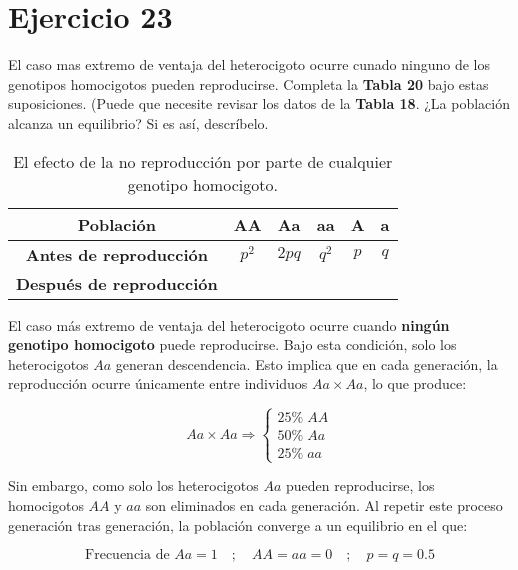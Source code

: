 \documentclass{article}
\begin{document}
\section*{Ejercicio 23}
El caso mas extremo de ventaja del heterocigoto ocurre cunado ninguno de los genotipos homocigotos pueden reproducirse. Completa la \textbf{Tabla 20} bajo estas suposiciones. (Puede que necesite revisar los datos de la \textbf{Tabla 18}. ¿La población alcanza un equilibrio? Si es así, descríbelo. 

\begin{table}[h!]
\centering
\caption{El efecto de la no reproducción por parte de cualquier genotipo homocigoto.}
\begin{tabular}{|c|c|c|c|c|c|}
\hline
\textbf{Población} & \textbf{AA} & \textbf{Aa} & \textbf{aa} & \textbf{A} & \textbf{a} \\
\hline
\textbf{Antes de reproducción} & \( p^2 \) & \( 2pq \) & \( q^2 \) & \( p \) & \( q \) \\
\textbf{Después de reproducción} &  &  &  &  &  \\
\hline
\end{tabular}
\end{table}

El caso más extremo de ventaja del heterocigoto ocurre cuando \textbf{ningún genotipo homocigoto} puede reproducirse.  
Bajo esta condición, solo los heterocigotos \( Aa \) generan descendencia.  
Esto implica que en cada generación, la reproducción ocurre únicamente entre individuos \( Aa \times Aa \), lo que produce:

\[
Aa \times Aa \Rightarrow
\begin{cases}
25\% \; AA \\
50\% \; Aa \\
25\% \; aa
\end{cases}
\]

Sin embargo, como solo los heterocigotos \( Aa \) pueden reproducirse, los homocigotos \( AA \) y \( aa \) son eliminados en cada generación.  
Al repetir este proceso generación tras generación, la población converge a un equilibrio en el que:

\[
\text{Frecuencia de } Aa = 1 \quad ; \quad AA = aa = 0 \quad ; \quad p = q = 0.5
\]

\vspace{1em}
\end{document}
